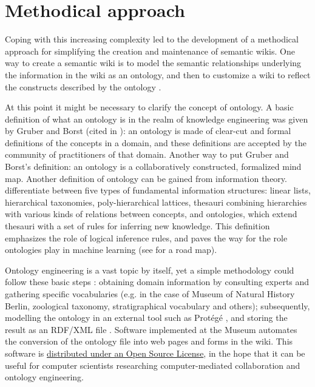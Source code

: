 \documentclass{IJCS_template}
\begin{document}
{\section{Methodical approach}
Coping with this increasing complexity led to the development of a methodical approach for simplifying the creation and maintenance of semantic wikis. One way to create a semantic wiki is to model the semantic relationships underlying the information in the wiki as an ontology, and then to customize a wiki to reflect the constructs described by the ontology \citep{di2006automatic}. 

At this point it might be necessary to clarify the concept of ontology. A basic definition of what an ontology is in the realm of knowledge engineering was given by Gruber and Borst (cited in \citep{corcho2003methodologies}): an ontology is made of clear-cut and formal definitions of the concepts in a domain, and these definitions are accepted by the community of practitioners of that domain. Another way to put Gruber and Borst's definition: an ontology is a collaboratively constructed, formalized mind map.
Another definition of ontology can be gained from information theory. \citet{pieterse2014lists} differentiate between five types of fundamental information structures: linear lists, hierarchical taxonomies, poly-hierarchical lattices, thesauri combining hierarchies with various kinds of relations between concepts, and ontologies, which extend thesauri with a set of rules for inferring new knowledge. This definition emphasizes the role of logical inference rules, and paves the way for the role ontologies play in machine learning (see \citet{zhou2007ontology} for a road map).

Ontology engineering is a vast topic by itself, yet a simple methodology could follow these basic steps \citep{noy2001ontology}: obtaining domain information by consulting experts and gathering specific vocabularies (e.g. in the case of Museum of Natural History Berlin, zoological taxonomy, stratigraphical vocabulary and others); subsequently, modelling the ontology in an external tool such as Protégé \citep{musen2015protege}, and storing the result as an RDF/XML file \citep{rdfspec}. Software implemented at the Museum automates the conversion of the ontology file into web pages and forms in the wiki. This software is \href{https://github.com/MfN-Berlin/RDF-to-SemanticWiki}{distributed under an Open Source License}, in the hope that it can be useful for computer scientists researching computer-mediated collaboration and ontology engineering.

}
\end{document}

